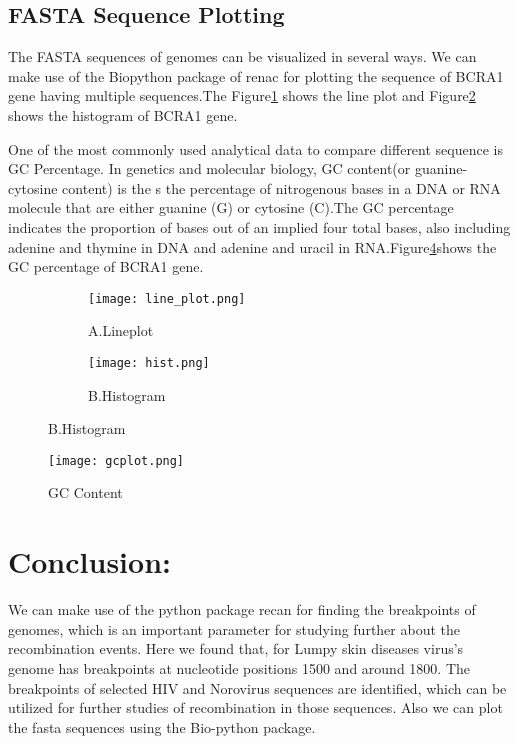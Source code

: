 \documentclass{article}
\begin{document}
\subsection{FASTA Sequence Plotting}
The FASTA sequences of genomes can be visualized in several ways. We can make use of the Biopython package of renac for plotting the sequence of BCRA1 gene having multiple sequences.The Figure\ref{fig:4} shows the line plot and  Figure\ref{figu:4} shows the histogram of BCRA1 gene.

One of the most commonly used analytical data to compare different sequence is GC Percentage. In genetics and molecular biology, GC content(or guanine-cytosine content) is the s the percentage of nitrogenous bases in a DNA or RNA molecule that are either guanine (G) or cytosine (C)\cite{protozanova2006base}.The GC percentage indicates the proportion of 
bases out of an implied four total bases, also including adenine and thymine in DNA and adenine and uracil in RNA.Figure\ref{Figure:5}shows the GC percentage of BCRA1 gene.

\begin{figure}
\centering
\begin{subfigure}{.6\textwidth}
  \centering
  \texttt{[image: line\_plot.png]}
  \caption{A.Lineplot}
  \label{fig:4}
\end{subfigure}%
\begin{subfigure}{.6\textwidth}
  \centering
  \texttt{[image: hist.png]}
  \caption{B.Histogram}
  \label{figu:4}
\end{subfigure}
\label{figure:4}
\end{figure}

\begin{figure}
    \centering
    \texttt{[image: gcplot.png]}
    \caption{GC Content}
    \label{Figure:5}
\end{figure}

\section{Conclusion:}
We can make use of the python package recan for finding the breakpoints of genomes, which is an important parameter for studying further about the recombination events. Here we found that, for Lumpy skin diseases virus's genome has breakpoints at nucleotide positions 1500 and around 1800. The breakpoints of selected HIV and Norovirus sequences are identified, which can be utilized for further studies of recombination in those sequences. Also we can plot the fasta sequences using the Bio-python package.


 

\end{document}
